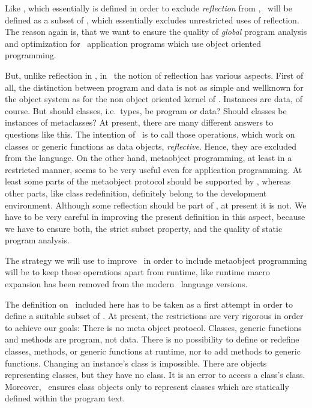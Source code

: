% 

Like , which essentially is defined in order to exclude {\em
reflection} from \CL, \ will be defined as a subset of \CLOS,
which essentially excludes unrestricted uses of reflection.  The
reason again is, that we want to ensure the quality of {\em global}
program analysis and optimization for \ application programs which
use object oriented programming.

But, unlike reflection in \CL, in \CLOS\ the notion of reflection has
various aspects. First of all, the distinction between program and
data is not as simple and wellknown for the object system as for the
non object oriented kernel of \CL. Instances are data, of course. But
should classes, i.e.\ types, be program or data? Should classes be
instances of metaclasses?  At present, there are many different
answers to questions like this. The intention of \ is to call
those operations, which work on classes or generic functions as data
objects, {\em reflective}.  Hence, they are excluded from the
language. On the other hand, metaobject programming, at least in a
restricted manner, seems to be very useful even for application
programming. At least some parts of the metaobject protocol should be
supported by , whereas other parts, like class redefinition,
definitely belong to the development environment.  Although some
reflection should be part of , at present it is not. We
have to be very careful in improving the present definition in this
aspect, because we have to ensure both, the strict subset property,
and the quality of static program analysis.

The strategy we will use to improve \ in order to include
metaobject programming will be to keep those operations apart from
runtime, like runtime macro expansion has been removed from  the
modern \Lisp\ language versions. 

The definition on \ included here has to be taken as a
first attempt in order to define a suitable subset of \CLOS. At
present, the restrictions are very rigorous in order to achieve our
goals: There is no meta object protocol. Classes, generic functions
and methods are program, not data. There is no possibility to define
or redefine classes, methods, or generic functions at runtime,
nor to add methods to generic functions. Changing an
instance's class is impossible. There are objects representing classes,
but they have no class. It is an error to access a class's
class. Moreover, \ ensures class objects only to represent
classes which are statically defined within the program text.

